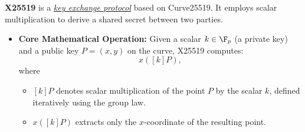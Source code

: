\textbf{X25519} is a \underline{\textit{key exchange protocol}} based on Curve25519. It employs scalar multiplication to derive a shared secret between two parties.

\begin{itemize}
	\item \textbf{Core Mathematical Operation:}
	Given a scalar $k\in\F_p$ (a private key) and a public key $P=(x,y)$ on the curve, X25519 computes: \[
	x([k]P),
	\] where \begin{itemize}
		\item[$\bullet$] $[k]P$ denotes scalar multiplication of the point $P$ by the scalar $k$, defined iteratively using the group law.
		\item[$\bullet$] $x([k]P)$ extracts only the $x$-coordinate of the resulting point.
	\end{itemize}
\end{itemize}